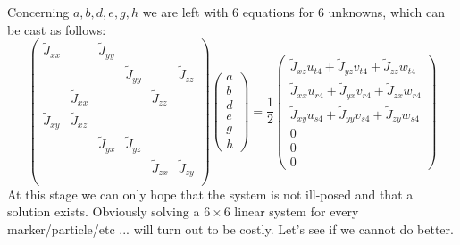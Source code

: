 Concerning $a,b,d,e,g,h$ we are left with 6 equations for 6 unknowns, which can be cast as follows:
\[
\left(
\begin{array}{cccccc}
\tilde{J}_{xx} & & \tilde{J}_{yy} & & & \\
 & & & \tilde{J}_{yy} & &  \tilde{J}_{zz}\\ 
 & \tilde{J}_{xx} & & & \tilde{J}_{zz} & \\ 
 \tilde{J}_{xy} &  \tilde{J}_{xz} & & & & \\ 
 & & \tilde{J}_{yx} & \tilde{J}_{yz} & \\ 
 & & & & \tilde{J}_{zx} & \tilde{J}_{zy} \\ 
\end{array}
\right)
\left(
\begin{array}{c}
a \\b\\ d\\ e\\ g\\ h
\end{array}
\right)
=
\frac{1}{2}
\left(
\begin{array}{c}
 \tilde{J}_{xz} u_{t4} + \tilde{J}_{yz} v_{t4} + \tilde{J}_{zz} w_{t4} \\
 \tilde{J}_{xx} u_{r4} + \tilde{J}_{yx} v_{r4} + \tilde{J}_{zx} w_{r4} \\
 \tilde{J}_{xy} u_{s4} + \tilde{J}_{yy} v_{s4} + \tilde{J}_{zy} w_{s4} \\
 0 \\ 0 \\  0
\end{array}
\right)
\]
At this stage we can only hope that the system is not ill-posed and that 
a solution exists.
Obviously solving a $6\times 6$ linear system for every marker/particle/etc ... 
will turn out to be costly. Let's see if we cannot do better.

